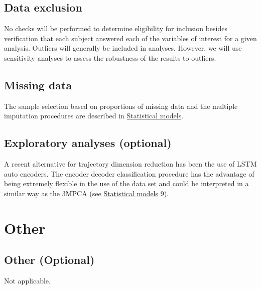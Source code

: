 \documentclass[]{article}
\begin{document}
\hypertarget{data-exclusion}{%
\subsection{Data exclusion}\label{data-exclusion}}

No checks will be performed to determine eligibility for inclusion
besides verification that each subject answered each of the variables of
interest for a given analysis. Outliers will generally be included in
analyses. However, we will use sensitivity analyses to assess the
robustness of the results to outliers.

\hypertarget{missing-data}{%
\subsection{Missing data}\label{missing-data}}

The sample selection based on proportions of missing data and the
multiple imputation procedures are described in
\protect\hyperlink{statistical-models}{Statistical models}.

\hypertarget{exploratory-analyses-optional}{%
\subsection{Exploratory analyses
(optional)}\label{exploratory-analyses-optional}}

A recent alternative for trajectory dimension reduction has been the use
of LSTM auto encoders. The encoder decoder classification procedure has
the advantage of being extremely flexible in the use of the data set and
could be interpreted in a similar way as the 3MPCA (see
\protect\hyperlink{statistical-models}{Statistical models} 9).

\hypertarget{other}{%
\section{Other}\label{other}}

\hypertarget{other-optional}{%
\subsection{Other (Optional)}\label{other-optional}}

Not applicable.

\hypertarget{section}{%
\subsection{}\label{section}}

\vspace{-2pc}
\setlength{\parindent}{-0.5in}
\setlength{\leftskip}{-1in}
\setlength{\parskip}{8pt}

\noindent


\end{document}
